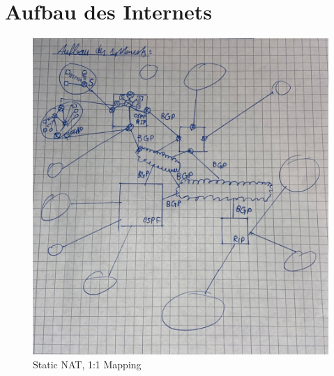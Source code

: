 \chapter{Aufbau des Internets}
\begin{figure}[H]
	\centering
	\includegraphics[width=0.8\linewidth]{figures/aufbau_internet.jpeg}
	\caption{Static NAT, 1:1 Mapping}
\end{figure}